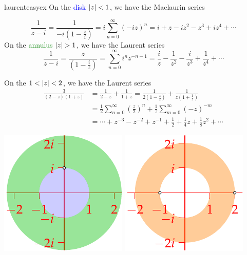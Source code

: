 \begin{examples}{}{laurenteasyex}
	\exstart On the \textcolor{blue}{disk $\left| z\right|<1$}, we have the Maclaurin series
	
	\begin{enumerate}\setcounter{enumi}{1}
	  \begin{minipage}[t]{0.73\linewidth}\vspace{-13pt}
		  \item[]%
		  \[
		  	\frac 1{z-i}=\frac 1{-i(1-\frac zi)}
		  	=i\sum_{n=0}^\infty(-iz)^n
		  	=i+z-iz^2-z^3+iz^4+\cdots
		  \]
			On the \textcolor{Green}{annulus $\nm z>1$}, we have the Laurent series
			\[
				\frac 1{z-i}=\frac z{(1-\frac iz)}
				=\sum_{n=0}^\infty i^nz^{-n-1}
				=\frac iz-\frac 1{z^2}-\frac i{z^3}+\frac 1{z^4}+\cdots
			\]
		
			\item On the \textcolor{orange}{$1<\left| z\right|<2$}, we have the Laurent series
			\begin{align*}
				\frac 3{(2-z)(1+z)}
				&=\frac 1{2-z}+\frac 1{1+z}=\frac 1{2(1-\frac z2)}+\frac 1{z(1+\frac 1z)} \\
				&=\frac 12\sum_{n=0}^\infty\left(\frac z2\right)^n+\frac 1z\sum_{m=0}^\infty(-z)^{-m}\\
				&=\cdots +z^{-3}-z^{-2}+z^{-1}+\frac 12+\frac 14z+\frac 18z^2+\cdots
			\end{align*}
		\end{minipage}
		\hfill
		\begin{minipage}[t]{0.26\linewidth}\vspace{-20pt}
			\flushright\includegraphics[scale=0.95]{laurent5}\bigbreak
			\includegraphics[scale=0.95]{laurent6}
		\end{minipage}\par	
		

\end{enumerate}
\end{examples}
